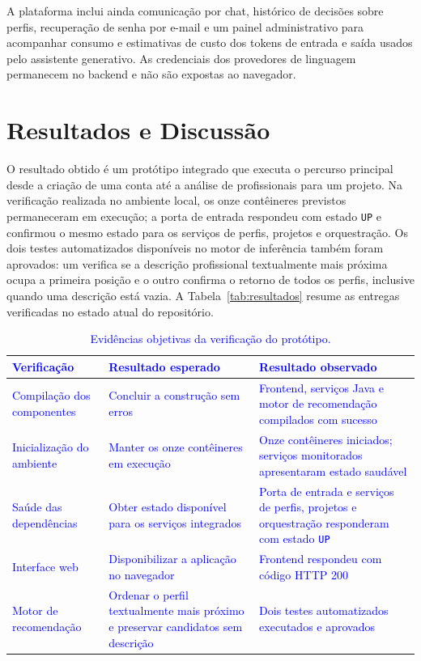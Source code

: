 \documentclass[12pt]{article}
\begin{document}
A plataforma inclui ainda comunicação por chat, histórico de decisões sobre perfis, recuperação de senha por e-mail e um painel administrativo para acompanhar consumo e estimativas de custo dos tokens de entrada e saída usados pelo assistente generativo. As credenciais dos provedores de linguagem permanecem no backend e não são expostas ao navegador.

\section{Resultados e Discussão}

O resultado obtido é um protótipo integrado que executa o percurso principal desde a criação de uma conta até a análise de profissionais para um projeto. Na verificação realizada no ambiente local, os onze contêineres previstos permaneceram em execução; a porta de entrada respondeu com estado \texttt{UP} e confirmou o mesmo estado para os serviços de perfis, projetos e orquestração. Os dois testes automatizados disponíveis no motor de inferência também foram aprovados: um verifica se a descrição profissional textualmente mais próxima ocupa a primeira posição e o outro confirma o retorno de todos os perfis, inclusive quando uma descrição está vazia. A Tabela~\ref{tab:resultados} resume as entregas verificadas no estado atual do repositório.

\begin{table}[ht]
\centering
\caption{\textcolor{blue}{Evidências objetivas da verificação do protótipo.}}
\label{tab:verificacoes}
\begin{tabularx}{\textwidth}{p{}X X}
\toprule
\textcolor{blue}{\textbf{Verificação}} & \textcolor{blue}{\textbf{Resultado esperado}} & \textcolor{blue}{\textbf{Resultado observado}} \\
\midrule
\textcolor{blue}{Compilação dos componentes} & \textcolor{blue}{Concluir a construção sem erros} & \textcolor{blue}{Frontend, serviços Java e motor de recomendação compilados com sucesso} \\
\textcolor{blue}{Inicialização do ambiente} & \textcolor{blue}{Manter os onze contêineres em execução} & \textcolor{blue}{Onze contêineres iniciados; serviços monitorados apresentaram estado saudável} \\
\textcolor{blue}{Saúde das dependências} & \textcolor{blue}{Obter estado disponível para os serviços integrados} & \textcolor{blue}{Porta de entrada e serviços de perfis, projetos e orquestração responderam com estado \texttt{UP}} \\
\textcolor{blue}{Interface web} & \textcolor{blue}{Disponibilizar a aplicação no navegador} & \textcolor{blue}{Frontend respondeu com código HTTP 200} \\
\textcolor{blue}{Motor de recomendação} & \textcolor{blue}{Ordenar o perfil textualmente mais próximo e preservar candidatos sem descrição} & \textcolor{blue}{Dois testes automatizados executados e aprovados} \\
\bottomrule
\end{tabularx}
\end{table}
\end{document}
